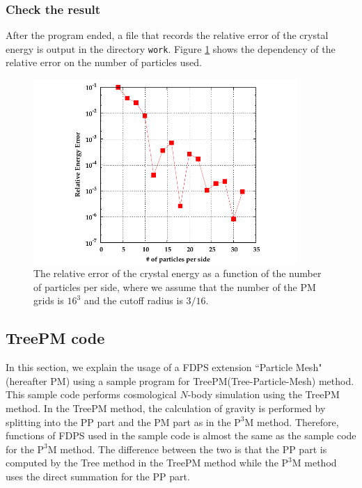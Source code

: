 \subsubsection{Check the result}
After the program ended, a file that records the relative error of the crystal energy is output in the directory \texttt{work}.
Figure \ref{fig:p3m} shows the dependency of the relative error on the number of particles used.

\begin{figure}
\centering
\includegraphics[width=10cm]{fig/p3m.pdf}
\caption{The relative error of the crystal energy as a function of the number of particles per side, where we assume that the number of the PM grids is $16^{3}$ and the cutoff radius is $3/16$.}
\label{fig:p3m}
\end{figure}
\clearpage

\ifCpp
\subsection{TreePM code} \label{subsec:TreePM}
In this section, we explain the usage of a FDPS extension ``Particle Mesh" (hereafter \textsf{PM}) using a sample program for TreePM(Tree-Particle-Mesh) method. This sample code performs cosmological $N$-body simulation using the TreePM method. In the TreePM method, the calculation of gravity is performed by splitting into the PP part and the PM part as in the $\mathrm{P^{3}M}$ method. Therefore, functions of FDPS used in the sample code is almost the same as the sample code for the $\mathrm{P^{3}M}$ method. The difference between the two is that the PP part is computed by the Tree method in the TreePM method while the $\mathrm{P^{3}M}$ method uses the direct summation for the PP part.

